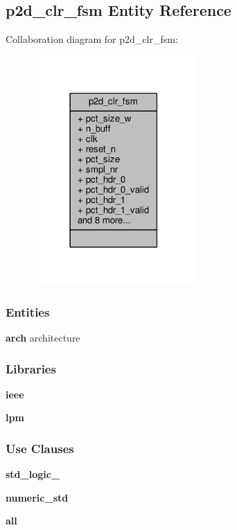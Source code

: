 \subsection{p2d\+\_\+clr\+\_\+fsm Entity Reference}
\label{classp2d__clr__fsm}


Collaboration diagram for p2d\+\_\+clr\+\_\+fsm\+:\nopagebreak
\begin{figure}[H]
\begin{center}
\leavevmode
\includegraphics[width=174pt]{d1/dc2/classp2d__clr__fsm__coll__graph}
\end{center}
\end{figure}
\subsubsection*{Entities}
\begin{DoxyCompactItemize}
\item 
{\bf arch} architecture
\end{DoxyCompactItemize}
\subsubsection*{Libraries}
 \begin{DoxyCompactItemize}
\item 
{\bf ieee} 
\item 
{\bf lpm} 
\end{DoxyCompactItemize}
\subsubsection*{Use Clauses}
 \begin{DoxyCompactItemize}
\item 
{\bf std\+\_\+logic\+\_}   
\item 
{\bf numeric\+\_\+std}   
\item 
{\bf  all }   
\end{DoxyCompactItemize}
